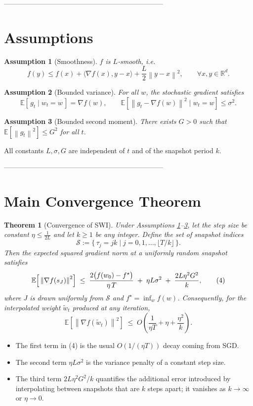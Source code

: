 \documentclass{article}
\newtheorem{theorem}{Theorem}
\newtheorem{assumption}{Assumption}
\newcommand{\E}{\mathbb{E}}
\newcommand{\R}{\mathbb{R}}
\newcommand{\norm}[1]{\left\lVert #1\right\rVert}
\begin{document}
---------------------------------------------------------------------

\section*{Assumptions}
\begin{assumption}[Smoothness]\label{ass:smooth}
$f$ is $L$‑smooth, i.e.
\[
    f(y)\le f(x)+\langle\nabla f(x),y-x\rangle+\frac{L}{2}\norm{y-x}^2,
    \qquad\forall x,y\in\R^d .
\tag{A1}
\]
\end{assumption}
\begin{assumption}[Bounded variance]\label{ass:var}
For all $w$, the stochastic gradient satisfies
\[
    \E\!\left[\,g_t\mid w_t=w\,\right]=\nabla f(w),\qquad
    \E\!\left[\norm{g_t-\nabla f(w)}^2\mid w_t=w\right]\le\sigma^2 .
\tag{A2}
\]
\end{assumption}
\begin{assumption}[Bounded second moment]\label{ass:bound}
There exists $G>0$ such that $\E\!\left[\norm{g_t}^2\right]\le G^2$ for all $t$.
\end{assumption}
All constants $L,\sigma,G$ are independent of $t$ and of the snapshot period $k$.

---------------------------------------------------------------------

\section*{Main Convergence Theorem}
\begin{theorem}[Convergence of SWI]\label{thm:main}
Under Assumptions \ref{ass:smooth}–\ref{ass:bound}, let the step size be constant $\eta\le \frac{1}{2L}$ and let $k\ge 1$ be any integer. Define the set of snapshot indices
\[
    \mathcal S:=\{\,\tau_j=jk\mid j=0,1,\dots,\lfloor T/k\rfloor\,\}.
\]
Then the expected squared gradient norm at a uniformly random snapshot satisfies
\[
    \E\Bigl[\,\norm{\nabla f(s_J)}^2\Bigr]
    \;\le\;
    \frac{2\bigl(f(w_0)-f^{\star}\bigr)}{\eta\,T}
    \;+\;
    \eta L\sigma^2
    \;+\;
    \frac{2L\eta^2 G^2}{k},
\tag{4}
\]
where $J$ is drawn uniformly from $\mathcal S$ and $f^{\star}=\inf_{w}f(w)$.
Consequently, for the interpolated weight $\widetilde w_t$ produced at any iteration,
\[
    \E\!\left[\norm{\nabla f(\widetilde w_t)}^2\right]
    \;\le\;
    O\!\left(\frac{1}{\eta T}+\eta+\frac{\eta^2}{k}\right).
\tag{5}
\]
\end{theorem}
\begin{itemize}
    \item The first term in (4) is the usual $O(1/(\eta T))$ decay coming from SGD.
    \item The second term $\eta L\sigma^2$ is the variance penalty of a constant step size.
    \item The third term $2L\eta^2 G^2/k$ quantifies the additional error introduced by interpolating between snapshots that are $k$ steps apart; it vanishes as $k\to\infty$ or $\eta\to0$.
\end{itemize}
\end{document}
